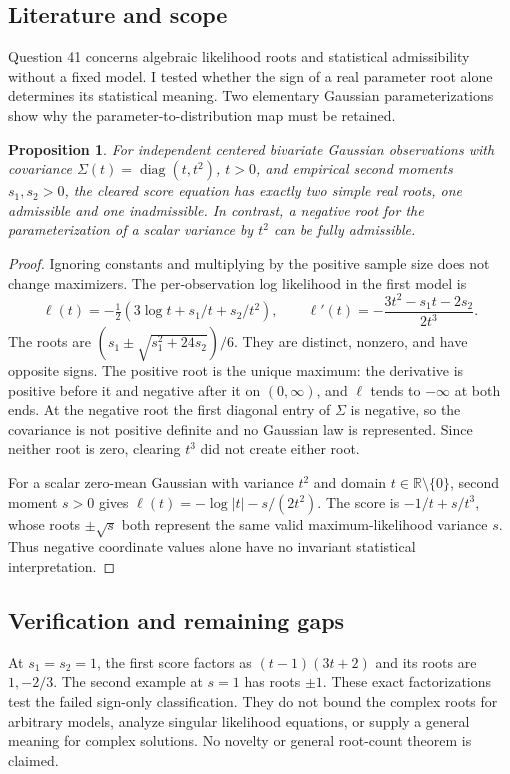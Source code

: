 \documentclass[11pt]{article}
\newtheorem{proposition}{Proposition}
\begin{document}
\subsection{Literature and scope}
Question 41 concerns algebraic likelihood roots and statistical admissibility without a fixed model. I tested whether the sign of a real parameter root alone determines its statistical meaning. Two elementary Gaussian parameterizations show why the parameter-to-distribution map must be retained.
\begin{proposition}
For independent centered bivariate Gaussian observations with covariance $\Sigma(t)=\operatorname{diag}(t,t^2)$, $t>0$, and empirical second moments $s_1,s_2>0$, the cleared score equation has exactly two simple real roots, one admissible and one inadmissible. In contrast, a negative root for the parameterization of a scalar variance by $t^2$ can be fully admissible.
\end{proposition}
\begin{proof}
Ignoring constants and multiplying by the positive sample size does not change maximizers. The per-observation log likelihood in the first model is
\[
\ell(t)=-\tfrac12(3\log t+s_1/t+s_2/t^2),\qquad
\ell'(t)=-\frac{3t^2-s_1t-2s_2}{2t^3}.
\]
The roots are $(s_1\pm\sqrt{s_1^2+24s_2})/6$. They are distinct, nonzero, and have opposite signs. The positive root is the unique maximum: the derivative is positive before it and negative after it on $(0,\infty)$, and $\ell$ tends to $-\infty$ at both ends. At the negative root the first diagonal entry of $\Sigma$ is negative, so the covariance is not positive definite and no Gaussian law is represented. Since neither root is zero, clearing $t^3$ did not create either root.

For a scalar zero-mean Gaussian with variance $t^2$ and domain $t\in\mathbb R\setminus\{0\}$, second moment $s>0$ gives $\ell(t)=-\log|t|-s/(2t^2)$. The score is $-1/t+s/t^3$, whose roots $\pm\sqrt{s}$ both represent the same valid maximum-likelihood variance $s$. Thus negative coordinate values alone have no invariant statistical interpretation.
\end{proof}
\subsection{Verification and remaining gaps}
At $s_1=s_2=1$, the first score factors as $(t-1)(3t+2)$ and its roots are $1,-2/3$. The second example at $s=1$ has roots $\pm1$. These exact factorizations test the failed sign-only classification. They do not bound the complex roots for arbitrary models, analyze singular likelihood equations, or supply a general meaning for complex solutions. No novelty or general root-count theorem is claimed.
\end{document}
